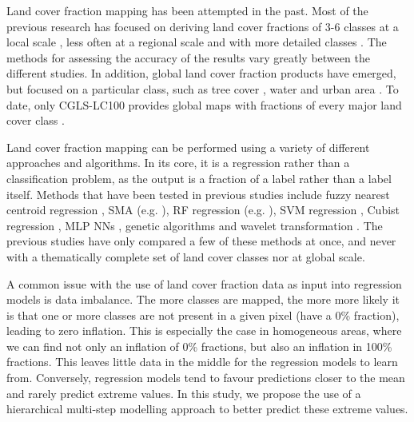 \documentclass[review,authoryear,3p]{elsarticle}
\begin{document}
Land cover fraction mapping has been attempted in the past.
Most of the previous research has focused on deriving land cover fractions of 3-6 classes at a local scale  \citep{adams_classification_1995, foody1996fuzzyevaluation, walton2008subpixelrf, hansen_continuous_2011, sharma_assessing_2011, uma_shankar_wavelet-fuzzy_2011, dwivedi_optimisation_2012, lizarazo_quantitative_2012, gessner_estimating_2013, okujeni_generalizing_2018}, less often at a regional scale and with more detailed classes \citep{colditz_land_2011}.
The methods for assessing the accuracy of the results vary greatly between the different studies.
In addition, global land cover fraction products have emerged, but focused on a particular class, such as tree cover \citep{hansen_global_2003, Hansen2013forestchange, townshend_global_2017}, water \citep{schroeder_development_2015, pekel_high-resolution_2016} and urban area \citep{corbane_automated_2019, gao_mapping_2020, gong_annual_2020}.
To date, only \ac{CGLS-LC100} \citep{marcel_buchhorn_copernicus_2019} provides global maps with fractions of every major land cover class \citep{nandin-erdene_tsendbazar_copernicus_2019}.

Land cover fraction mapping can be performed using a variety of different approaches and algorithms.
In its core, it is a regression rather than a classification problem, as the output is a fraction of a label rather than a label itself.
Methods that have been tested in previous studies include fuzzy nearest centroid regression \citep{zhang2001fullyfuzzy}, \ac{SMA} (e.g. \citealp{shimabukuro1991least, adams_classification_1995, hobbs2003linear, yang_landsat_2012}), \ac{RF} regression (e.g. \citealp{walton2008subpixelrf}), \gls{SVM} regression \citep{walton2008subpixelrf}, Cubist regression \citep{walton2008subpixelrf}, \gls{MLP} \glspl{NN} \citep{zhang2001fullyfuzzy}, genetic algorithms \citep{stavrakoudis_boosted_2011} and wavelet transformation \citep{uma_shankar_wavelet-fuzzy_2011}.
The previous studies have only compared a few of these methods at once, and never with a thematically complete set of land cover classes nor at global scale.

A common issue with the use of land cover fraction data as input into regression models is data imbalance.
The more classes are mapped, the more more likely it is that one or more classes are not present in a given pixel (have a 0\% fraction), leading to zero inflation.
This is especially the case in homogeneous areas, where we can find not only an inflation of 0\% fractions, but also an inflation in 100\% fractions.
This leaves little data in the middle for the regression models to learn from.
Conversely, regression models tend to favour predictions closer to the mean and rarely predict extreme values.
In this study, we propose the use of a hierarchical multi-step modelling approach to better predict these extreme values.
\end{document}
